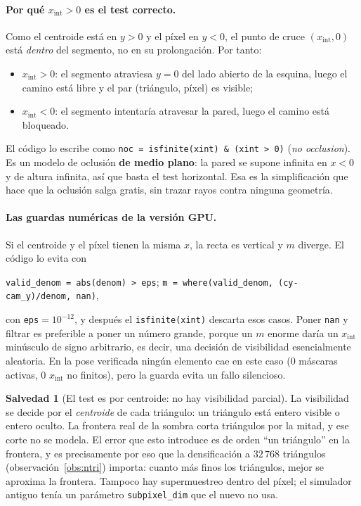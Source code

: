 \documentclass[11pt,a4paper]{article}
\newcommand{\code}[1]{\texttt{#1}}
\theoremstyle{definition}
\newtheorem{salvedad}{Salvedad}
\theoremstyle{plain}
\begin{document}
\paragraph{Por qué $x_{\text{int}}>0$ es el test correcto.}
Como el centroide está en $y>0$ y el píxel en $y<0$, el punto de cruce
$(x_{\text{int}},0)$ está \emph{dentro} del segmento, no en su prolongación. Por
tanto:
%
\begin{itemize}[leftmargin=*]
  \item $x_{\text{int}}>0$: el segmento atraviesa $y=0$ del lado abierto de la
        esquina, luego el camino está libre y el par (triángulo, píxel) es
        visible;
  \item $x_{\text{int}}<0$: el segmento intentaría atravesar la pared, luego el
        camino está bloqueado.
\end{itemize}
%
El código lo escribe como
\code{noc = isfinite(xint) \& (xint > 0)} (\emph{no occlusion}). Es un modelo de
oclusión \textbf{de medio plano}: la pared se supone infinita en $x<0$ y de
altura infinita, así que basta el test horizontal. Esa es la simplificación que
hace que la oclusión salga gratis, sin trazar rayos contra ninguna geometría.

\paragraph{Las guardas numéricas de la versión GPU.}
Si el centroide y el píxel tienen la misma $x$, la recta es vertical y $m$
diverge. El código lo evita con
%
\begin{center}
\code{valid\_denom = abs(denom) > eps};\quad
\code{m = where(valid\_denom, (cy-cam\_y)/denom, nan)},
\end{center}
%
con \code{eps}$=10^{-12}$, y después el \code{isfinite(xint)} descarta esos
casos. Poner \code{nan} y filtrar es preferible a poner un número grande, porque
un $m$ enorme daría un $x_{\text{int}}$ minúsculo de signo arbitrario, es decir,
una decisión de visibilidad esencialmente aleatoria. En la pose verificada
ningún elemento cae en este caso ($0$ máscaras activas, $0$ $x_{\text{int}}$ no
finitos), pero la guarda evita un fallo silencioso.

\begin{salvedad}[El test es por centroide: no hay visibilidad parcial]
\label{sal:centroide}
La visibilidad se decide por el \emph{centroide} de cada triángulo: un triángulo
está entero visible o entero oculto. La frontera real de la sombra corta
triángulos por la mitad, y ese corte no se modela. El error que esto introduce
es de orden \enquote{un triángulo} en la frontera, y es precisamente por eso que
la densificación a $32\,768$ triángulos (observación~\ref{obs:ntri}) importa:
cuanto más finos los triángulos, mejor se aproxima la frontera. Tampoco hay
supermuestreo dentro del píxel; el simulador antiguo tenía un parámetro
\code{subpixel\_dim} que el nuevo no usa.
\end{salvedad}
\end{document}
